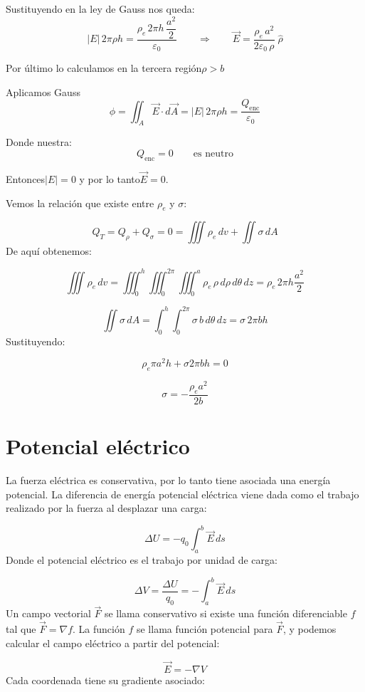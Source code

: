 \documentclass[a4paper,12pt]{article}
\begin{document}
\noindent
Sustituyendo en la ley de Gauss nos queda:
\[
|E|\,2\pi\rho h=\frac{\rho_{e}\,2\pi h\,\dfrac{a^{2}}{2}}{\varepsilon_{0}}
\qquad\Longrightarrow\qquad
\vec{E}=\frac{\rho_{e}\,a^{2}}{2\varepsilon_{0}\,\rho}\;\hat{\rho}
\]

\bigskip
\noindent
Por último lo calculamos en la tercera región\quad $\rho>b$

\noindent
Aplicamos Gauss
\[
\phi=\iint_{A}\vec{E}\cdot d\vec{A}
=|E|\,2\pi \rho h
=\frac{Q_{\text{enc}}}{\varepsilon_{0}}
\]


\newpage
\noindent
Donde nuestra:
\[
Q_{\text{enc}}=0
\qquad\text{es neutro}
\]

\noindent
Entonces\quad $|E|=0$ y por lo tanto\quad $\vec{E}=0$.

\medskip
\noindent
Vemos la relación que existe entre $\rho_e$ y $\sigma$:

\[
Q_T = Q_\rho + Q_\sigma = 0 = \iiint \rho_e \, dv + \iint \sigma \, dA
\]
De aquí obtenemos:

\[
\iiint \rho_e \, dv = \iiint_{0}^{h} \iiint_{0}^{2\pi} \iiint_{0}^{a} \rho_e \, \rho \, d\rho \, d\theta \, dz = \rho_e \, 2\pi h \frac{a^2}{2}
\]

\[
\iint \sigma \, dA = \int_{0}^{h} \int_{0}^{2\pi} \sigma \, b \, d\theta \, dz = \sigma \, 2\pi b h
\]
Sustituyendo:

\[
\rho_e \pi a^2 h + \sigma 2\pi b h = 0
\]

\[
\sigma = - \frac{\rho_e a^2}{2b}
\]
\newpage
\noindent
\section{Potencial eléctrico}
\noindent
La fuerza eléctrica es conservativa, por lo tanto tiene asociada una energía potencial.  
La diferencia de energía potencial eléctrica viene dada como el trabajo realizado por la fuerza al desplazar una carga:

\[
\Delta U = - q_0 \int_{a}^{b} \vec{E} \, ds
\]
Donde el potencial eléctrico es el trabajo por unidad de carga:

\[
\Delta V = \frac{\Delta U}{q_0} = - \int_{a}^{b} \vec{E} \, ds
\]
Un campo vectorial $\vec{F}$ se llama conservativo si existe una función diferenciable $f$ tal que $\vec{F} = \nabla f$.  
La función $f$ se llama función potencial para $\vec{F}$, y podemos calcular el campo eléctrico a partir del potencial:

\[
\vec{E} = - \nabla V
\]
Cada coordenada tiene su gradiente asociado:
\end{document}
